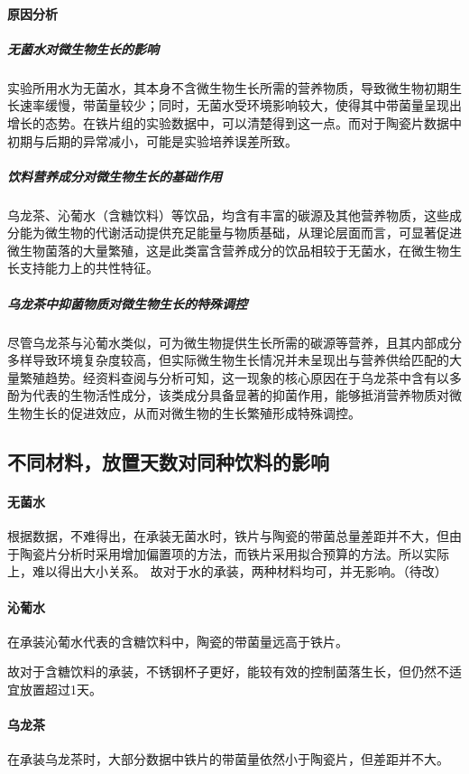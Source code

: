 \documentclass[12pt,a4paper]{ctexart}
\begin{document}
\paragraph{原因分析}
\subparagraph{无菌水对微生物生长的影响}
实验所用水为无菌水，其本身不含微生物生长所需的营养物质，导致微生物初期生长速率缓慢，带菌量较少；同时，无菌水受环境影响较大，使得其中带菌量呈现出增长的态势。在铁片组的实验数据中，可以清楚得到这一点。而对于陶瓷片数据中初期与后期的异常减小，可能是实验培养误差所致。
\subparagraph{饮料营养成分对微生物生长的基础作用}
乌龙茶、沁葡水（含糖饮料）等饮品，均含有丰富的碳源及其他营养物质，这些成分能为微生物的代谢活动提供充足能量与物质基础，从理论层面而言，可显著促进微生物菌落的大量繁殖，这是此类富含营养成分的饮品相较于无菌水，在微生物生长支持能力上的共性特征。
\subparagraph{乌龙茶中抑菌物质对微生物生长的特殊调控}
尽管乌龙茶与沁葡水类似，可为微生物提供生长所需的碳源等营养，且其内部成分多样导致环境复杂度较高，但实际微生物生长情况并未呈现出与营养供给匹配的大量繁殖趋势。经资料查阅与分析可知，这一现象的核心原因在于乌龙茶中含有以多酚为代表的生物活性成分\cite{HXSJ202002001}，该类成分具备显著的抑菌作用，能够抵消营养物质对微生物生长的促进效应，从而对微生物的生长繁殖形成特殊调控。

\subsection{不同材料，放置天数对同种饮料的影响}
\paragraph{无菌水}

根据数据，不难得出，在承装无菌水时，铁片与陶瓷的带菌总量差距并不大，但由于陶瓷片分析时采用增加偏置项的方法，而铁片采用拟合预算的方法。所以实际上，难以得出大小关系。
故对于水的承装，两种材料均可，并无影响。（待改）


\paragraph{沁葡水}
在承装沁葡水代表的含糖饮料中，陶瓷的带菌量远高于铁片。

故对于含糖饮料的承装，不锈钢杯子更好，能较有效的控制菌落生长，但仍然不适宜放置超过1天。

\paragraph{乌龙茶}
在承装乌龙茶时，大部分数据中铁片的带菌量依然小于陶瓷片，但差距并不大。
\end{document}

